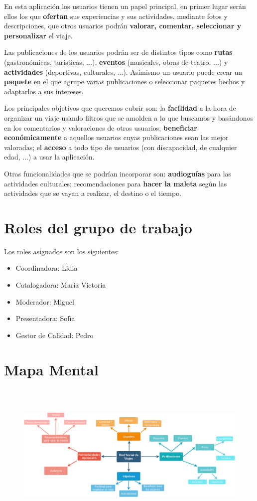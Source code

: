 \documentclass[11pt]{article}
\begin{document}
En esta aplicación los usuarios tienen un papel principal, en primer lugar serán ellos los que \textbf{ofertan} sus experiencias y sus actividades, mediante fotos y descripciones, que otros usuarios podrán \textbf{valorar, comentar, seleccionar y personalizar} el viaje.

Las publicaciones de los usuarios podrán ser de distintos tipos como \textbf{rutas} (gastronómicas, turísticas, ...), \textbf{eventos} (musicales, obras de teatro, ...) y \textbf{actividades} (deportivas, culturales, ...). Asímismo un usuario puede crear un \textbf{paquete} en el que agrupe varias publicaciones o seleccionar paquetes hechos y adaptarlos a sus intereses.

Los principales objetivos que queremos cubrir son: la \textbf{facilidad} a la hora de organizar un viaje usando filtros que se amolden a lo que buscamos y basándonos en los comentarios y valoraciones de otros usuarios; \textbf{beneficiar económicamente} a aquellos usuarios cuyas publicaciones sean las mejor valoradas; el \textbf{acceso} a todo tipo de usuarios (con discapacidad, de cualquier edad, ...) a usar la aplicación.

Otras funcionalidades que se podrían incorporar son: \textbf{audioguías} para las actividades culturales; recomendaciones para \textbf{hacer la maleta} según las actividades que se vayan a realizar, el destino o el tiempo.

\section {Roles del grupo de trabajo}
Los roles asignados son los siguientes:

\begin{itemize}
\item{Coordinadora}: Lidia
\item{Catalogadora}: María Victoria
\item{Moderador}: Miguel
\item{Presentadora}: Sofía
\item{Gestor de Calidad}: Pedro

\end{itemize}

\section {Mapa Mental}


\begin{figure}[h]
\centering
\includegraphics[width=17cm, height=7cm] {MapaMentalp1}
\end{figure}
\end{document}
